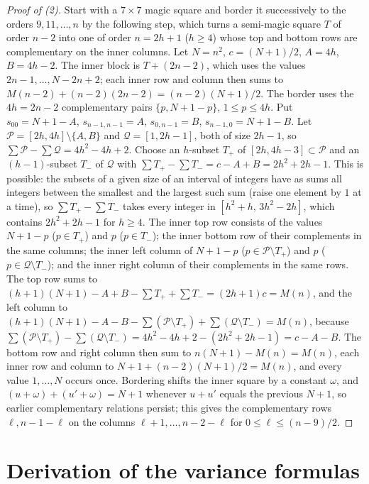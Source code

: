 \begin{proof}[Proof of (2)]
Start with a $7\times7$ magic square and border it successively to the orders $9,11,\dots,n$ by the following step, which turns a semi-magic square $T$ of order $n-2$ into one of order $n=2h+1$ ($h\ge4$) whose top and bottom rows are complementary on the inner columns.
Let $N=n^2$, $c=(N+1)/2$, $A=4h$, $B=4h-2$.
The inner block is $T+(2n-2)$, which uses the values $2n-1,\dots,N-2n+2$; each inner row and column then sums to $M(n-2)+(n-2)(2n-2)=(n-2)(N+1)/2$.
The border uses the $4h=2n-2$ complementary pairs $\{p,N+1-p\}$, $1\le p\le4h$.
Put $s_{00}=N+1-A$, $s_{n-1,n-1}=A$, $s_{0,n-1}=B$, $s_{n-1,0}=N+1-B$.
Let $\mathcal P=[2h,4h]\setminus\{A,B\}$ and $\mathcal Q=[1,2h-1]$, both of size $2h-1$, so $\sum\mathcal P-\sum\mathcal Q=4h^2-4h+2$.
Choose an $h$-subset $T_+$ of $[2h,4h-3]\subset\mathcal P$ and an $(h-1)$-subset $T_-$ of $\mathcal Q$ with $\sum T_+-\sum T_-=c-A+B=2h^2+2h-1$.
This is possible: the subsets of a given size of an interval of integers have as sums all integers between the smallest and the largest such sum (raise one element by $1$ at a time), so $\sum T_+-\sum T_-$ takes every integer in $[h^2+h,\,3h^2-2h]$, which contains $2h^2+2h-1$ for $h\ge4$.
The inner top row consists of the values $N+1-p$ ($p\in T_+$) and $p$ ($p\in T_-$); the inner bottom row of their complements in the same columns; the inner left column of $N+1-p$ ($p\in\mathcal P\setminus T_+$) and $p$ ($p\in\mathcal Q\setminus T_-$); and the inner right column of their complements in the same rows.
The top row sums to $(h+1)(N+1)-A+B-\sum T_++\sum T_-=(2h+1)c=M(n)$, and the left column to $(h+1)(N+1)-A-B-\sum(\mathcal P\setminus T_+)+\sum(\mathcal Q\setminus T_-)=M(n)$, because $\sum(\mathcal P\setminus T_+)-\sum(\mathcal Q\setminus T_-)=4h^2-4h+2-(2h^2+2h-1)=c-A-B$.
The bottom row and right column then sum to $n(N+1)-M(n)=M(n)$, each inner row and column to $N+1+(n-2)(N+1)/2=M(n)$, and every value $1,\dots,N$ occurs once.
Bordering shifts the inner square by a constant $\omega$, and $(u+\omega)+(u'+\omega)=N+1$ whenever $u+u'$ equals the previous $N+1$, so earlier complementary relations persist; this gives the complementary rows $\ell,n-1-\ell$ on the columns $\ell+1,\dots,n-2-\ell$ for $0\le\ell\le(n-9)/2$.
\end{proof}

\section{Derivation of the variance formulas}
\label{sec:app_variance}

